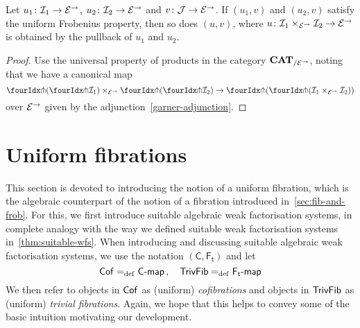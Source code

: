 \documentclass[reqno,10pt,a4paper,oneside,draft]{amsart}
\begin{document}
{{\begin{proposition} \label{uniform-frobenius-product-u} Let $u_1 \co \cal{I}_1 \to \cal{E}^\to$, $u_2 \co \cal{I}_2 \to \cal{E}^\to$ and
$v \co \cal{J} \to \cal{E}^\to$. If $(u_1, v)$ and $(u_2, v)$ satisfy the uniform Frobenius property, then so does $(u, v)$, where 
$u \co \cal{I}_1 \times_{\cal{E}^\to} \cal{I}_2 \to \cal{E}^\to$ is obtained by the pullback of $u_1$ and $u_2$.
\end{proposition}

\begin{proof}
Use the universal property of products in the category $\CAT_{/\cal{E}^\to}$, noting that we have a canonical map
\[
\liftl{(\liftr{\cal{I}_1})} \times_{\cal{E}^\to} \liftl{(\liftr{\cal{I}_2})} \to \liftl{(\liftr{(\cal{I}_1 \times_{\cal{E}^\to} \cal{I}_2)})}
\]
over $\cal{E}^\to$ given by the adjunction~\eqref{garner-adjunction}.
\end{proof}





\section{Uniform fibrations}
\label{sec:unif}




\newcommand{\CC}{\mathsf{C}}
\newcommand{\TF}{\mathsf{F_t}}

 This section is devoted to introducing the notion of a uniform fibration, which is the algebraic counterpart of the notion of a fibration
introduced in~\cref{sec:fib-and-frob}. For this, we first introduce suitable algebraic weak factorisation systems, in complete analogy with
the way we defined suitable weak factorisation systems in~\cref{thm:suitable-wfs}. When introducing and discussing suitable algebraic
weak factorisation systems, we use the notation $(\CC, \TF)$ and let
\[
  \Cof \defeq \pcoalg{\CC} \, , \quad \TrivFib \defeq \palg{\TF}
  \]
We then refer to objects in $\Cof$ as (uniform) \emph{cofibrations} and objects in $\TrivFib$ as (uniform) \emph{trivial fibrations}.
Again, we hope that this helps to convey some of the basic intuition motivating our development.  

}}
\end{document}
